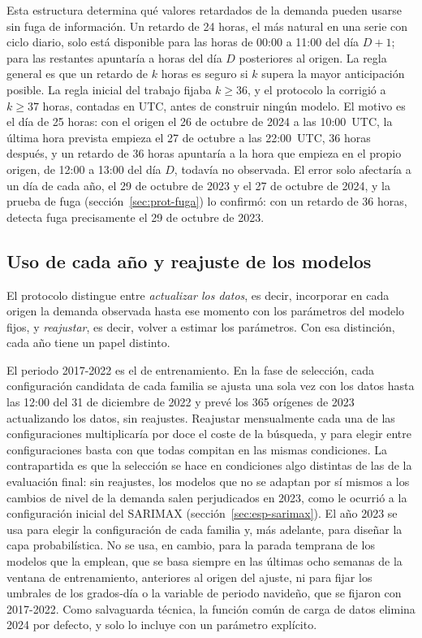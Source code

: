 Esta estructura determina qué valores retardados de la demanda pueden usarse
sin fuga de información. Un retardo de 24 horas, el más natural en una serie
con ciclo diario, solo está disponible para las horas de 00:00 a 11:00 del
día $D+1$; para las restantes apuntaría a horas del día $D$ posteriores al
origen. La regla general es que un retardo de $k$ horas es seguro si
$k$ supera la mayor anticipación posible. La regla inicial del trabajo
fijaba $k \ge 36$, y el protocolo la corrigió a $k \ge 37$ horas, contadas en
UTC, antes de construir ningún modelo. El motivo es el día de 25 horas: con el origen el 26
de octubre de 2024 a las 10:00~UTC, la última hora prevista empieza el 27 de
octubre a las 22:00~UTC, 36 horas después, y un retardo de 36 horas apuntaría
a la hora que empieza en el propio origen, de 12:00 a 13:00 del día $D$,
todavía no observada. El error solo afectaría a un día de cada año, el 29 de
octubre de 2023 y el 27 de octubre de 2024, y la prueba de fuga
(sección~\ref{sec:prot-fuga}) lo confirmó: con un retardo de 36 horas,
detecta fuga precisamente el 29 de octubre de 2023.

\subsection{Uso de cada año y reajuste de los modelos}\label{sec:prot-particiones}

El protocolo distingue entre \emph{actualizar los datos}, es decir,
incorporar en cada origen la demanda observada hasta ese momento con los
parámetros del modelo fijos, y \emph{reajustar}, es decir, volver a estimar
los parámetros. Con esa distinción, cada año tiene un papel distinto.

El periodo 2017-2022 es el de entrenamiento. En la fase de selección, cada
configuración candidata de cada familia se ajusta una sola vez con los datos
hasta las 12:00 del 31 de diciembre de 2022 y prevé los 365 orígenes de 2023
actualizando los datos, sin reajustes. Reajustar mensualmente cada una de las
configuraciones multiplicaría por doce el coste de la búsqueda, y para elegir
entre configuraciones basta con que todas compitan en las mismas condiciones.
La contrapartida es que la selección se hace en condiciones algo distintas
de las de la evaluación final: sin reajustes, los modelos que no se adaptan
por sí mismos a los cambios de nivel de la demanda salen perjudicados en
2023, como le ocurrió a la configuración inicial del SARIMAX
(sección~\ref{sec:esp-sarimax}). El año 2023 se usa para elegir la
configuración de cada familia y, más adelante, para diseñar la capa
probabilística. No se usa, en cambio, para la parada temprana de los modelos
que la emplean, que se basa siempre en las últimas ocho semanas de la ventana
de entrenamiento, anteriores al origen del ajuste, ni para fijar los umbrales
de los grados-día o la variable de periodo navideño, que se fijaron con
2017-2022. Como salvaguarda técnica, la función común de carga de datos
elimina 2024 por defecto, y solo lo incluye con un parámetro explícito.

